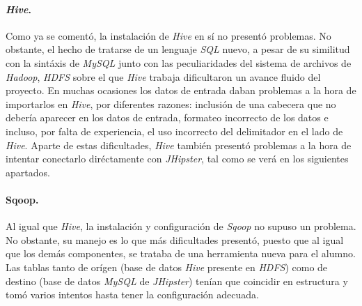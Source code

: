 \paragraph*{\textit{Hive}.} Como ya se comentó, la instalación de \textit{Hive} en sí no presentó problemas. No obstante, el hecho de tratarse de un lenguaje \textit{SQL} nuevo, a pesar de su similitud con la sintáxis de \textit{MySQL} junto con las peculiaridades del sistema de archivos de \textit{Hadoop}, \textit{HDFS} sobre el que \textit{Hive} trabaja dificultaron un avance fluido del proyecto. En muchas ocasiones los datos de entrada daban problemas a la hora de importarlos en \textit{Hive}, por diferentes razones: inclusión de una cabecera que no debería aparecer en los datos de entrada, formateo incorrecto de los datos e incluso, por falta de experiencia, el uso incorrecto del delimitador en el lado de \textit{Hive}. Aparte de estas dificultades, \textit{Hive} también presentó problemas a la hora de intentar conectarlo diréctamente con \textit{JHipster}, tal como se verá en los siguientes apartados.

\paragraph*{Sqoop.} Al igual que \textit{Hive}, la instalación y configuración de \textit{Sqoop} no supuso un problema. No obstante, su manejo es lo que más dificultades presentó, puesto que al igual que los demás componentes, se trataba de una herramienta nueva para el alumno. Las tablas tanto de orígen (base de datos \textit{Hive} presente en \textit{HDFS}) como de destino (base de datos \textit{MySQL} de \textit{JHipster}) tenían que coincidir en estructura y tomó varios intentos hasta tener la configuración adecuada. 	

